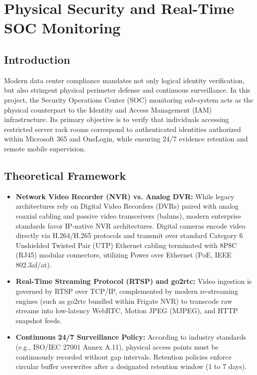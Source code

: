 
\section{Physical Security and Real-Time SOC Monitoring}

\subsection{Introduction}
Modern data center compliance mandates not only logical identity verification, but also stringent physical perimeter defense and continuous surveillance. In this project, the Security Operations Center (SOC) monitoring sub-system acts as the physical counterpart to the Identity and Access Management (IAM) infrastructure. Its primary objective is to verify that individuals accessing restricted server rack rooms correspond to authenticated identities authorized within Microsoft 365 and OneLogin, while ensuring 24/7 evidence retention and remote mobile supervision.

\subsection{Theoretical Framework}
\begin{itemize}
    \item \textbf{Network Video Recorder (NVR) vs. Analog DVR:} While legacy architectures rely on Digital Video Recorders (DVRs) paired with analog coaxial cabling and passive video transceivers (baluns), modern enterprise standards favor IP-native NVR architectures. Digital cameras encode video directly via H.264/H.265 protocols and transmit over standard Category 6 Unshielded Twisted Pair (UTP) Ethernet cabling terminated with 8P8C (RJ45) modular connectors, utilizing Power over Ethernet (PoE, IEEE 802.3af/at).
    \item \textbf{Real-Time Streaming Protocol (RTSP) and go2rtc:} Video ingestion is governed by RTSP over TCP/IP, complemented by modern re-streaming engines (such as go2rtc bundled within Frigate NVR) to transcode raw streams into low-latency WebRTC, Motion JPEG (MJPEG), and HTTP snapshot feeds.
    \item \textbf{Continuous 24/7 Surveillance Policy:} According to industry standards (e.g., ISO/IEC 27001 Annex A.11), physical access points must be continuously recorded without gap intervals. Retention policies enforce circular buffer overwrites after a designated retention window (1 to 7 days).
\end{itemize}

